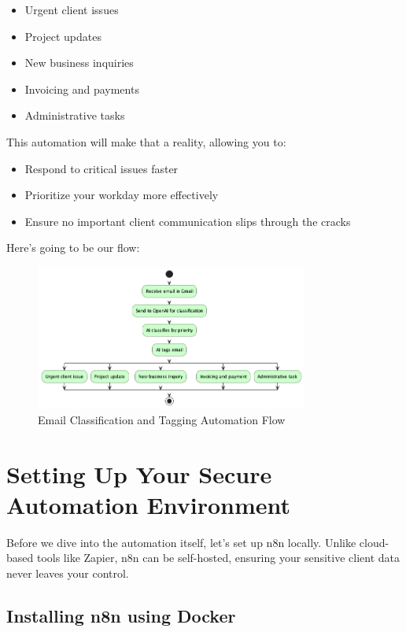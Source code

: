 \begin{itemize}
    \item Urgent client issues
    \item Project updates
    \item New business inquiries
    \item Invoicing and payments
    \item Administrative tasks
\end{itemize}

This automation will make that a reality, allowing you to:
\begin{itemize}
    \item Respond to critical issues faster
    \item Prioritize your workday more effectively
    \item Ensure no important client communication slips through the cracks
\end{itemize}

Here's going to be our flow:

\begin{figure}
    \centering
    \includegraphics[width=0.8\textwidth]{./figures/01-n8n-flow}
    \caption{Email Classification and Tagging Automation Flow}
    \label{fig:01_email_automation}
\end{figure}

\section{Setting Up Your Secure Automation Environment}

Before we dive into the automation itself, let's set up n8n locally. Unlike cloud-based tools like Zapier, n8n can be self-hosted, ensuring your sensitive client data never leaves your control.

\subsection{Installing n8n using Docker}

